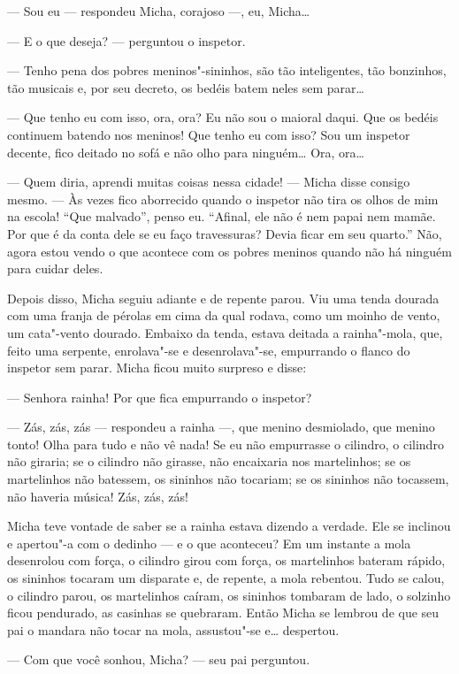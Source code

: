 --- Sou eu --- respondeu Micha, corajoso ---, eu, Micha\ldots{}

--- E o que deseja? --- perguntou o inspetor.

--- Tenho pena dos pobres meninos"-sininhos, são tão inteligentes, tão
bonzinhos, tão musicais e, por seu decreto, os bedéis batem neles sem
parar\ldots{}

--- Que tenho eu com isso, ora, ora? Eu não sou o maioral daqui. Que os
bedéis continuem batendo nos meninos! Que tenho eu com isso? Sou um
inspetor decente, fico deitado no sofá e não olho para ninguém\ldots{} Ora,
ora\ldots{}

--- Quem diria, aprendi muitas coisas nessa cidade! --- Micha disse
consigo mesmo. --- Às vezes fico aborrecido quando o inspetor não tira
os olhos de mim na escola! ``Que malvado'', penso eu. ``Afinal, ele não
é nem papai nem mamãe. Por que é da conta dele se eu faço travessuras?
Devia ficar em seu quarto.'' Não, agora estou vendo o que acontece com
os pobres meninos quando não há ninguém para cuidar deles.

Depois disso, Micha seguiu adiante e de repente parou. Viu uma tenda
dourada com uma franja de pérolas em cima da qual rodava, como um moinho
de vento, um cata"-vento dourado. Embaixo da tenda, estava deitada a
rainha"-mola, que, feito uma serpente, enrolava"-se e desenrolava"-se,
empurrando o flanco do inspetor sem parar. Micha ficou muito surpreso e
disse:

--- Senhora rainha! Por que fica empurrando o inspetor?

--- Zás, zás, zás --- respondeu a rainha ---, que menino desmiolado, que
menino tonto! Olha para tudo e não vê nada! Se eu não empurrasse o
cilindro, o cilindro não giraria; se o cilindro não girasse, não
encaixaria nos martelinhos; se os martelinhos não batessem, os sininhos
não tocariam; se os sininhos não tocassem, não haveria música! Zás, zás,
zás!

Micha teve vontade de saber se a rainha estava dizendo a verdade. Ele se
inclinou e apertou"-a com o dedinho --- e o que aconteceu? Em um instante
a mola desenrolou com força, o cilindro girou com força, os martelinhos
bateram rápido, os sininhos tocaram um disparate e, de repente, a mola
rebentou. Tudo se calou, o cilindro parou, os martelinhos caíram, os
sininhos tombaram de lado, o solzinho ficou pendurado, as casinhas se
quebraram. Então Micha se lembrou de que seu pai o mandara não tocar na
mola, assustou"-se e\ldots{} despertou.

--- Com que você sonhou, Micha? --- seu pai perguntou.

